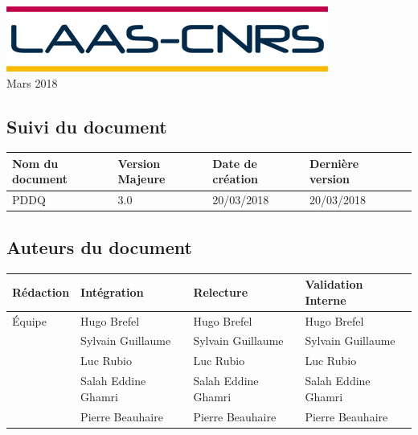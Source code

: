 \documentclass[10pt,a4paper]{article}
\begin{document}
\begin{titlepage}
\includegraphics[scale=0.3]{laas.png} \\[1.1cm] 

\large Mars 2018
 

\end{titlepage}

\newpage


\subsection*{Suivi du document}

\begin{center}
    \begin{tabular}{| l | l | l | l | l |}
    \hline
     \rowcolor{gray} Nom du document & Version Majeure & Date de création & Dernière version \\ \hline
    PDDQ & 3.0 & 20/03/2018 & 20/03/2018 \\ \hline
    \end{tabular}
\end{center}


\subsection*{Auteurs du document}

\begin{center}
    \begin{tabular}{| l | l | l | l |}
    \hline
    \rowcolor{gray} Rédaction & Intégration & Relecture & Validation Interne \\ \hline
    Équipe & Hugo Brefel & Hugo Brefel & Hugo Brefel \\ 
     & Sylvain Guillaume & Sylvain Guillaume & Sylvain Guillaume \\
     & Luc Rubio & Luc Rubio & Luc Rubio \\
     & Salah Eddine Ghamri & Salah Eddine Ghamri & Salah Eddine Ghamri \\
     & Pierre Beauhaire & Pierre Beauhaire & Pierre Beauhaire \\ \hline
    \end{tabular}
\end{center}
\end{document}
